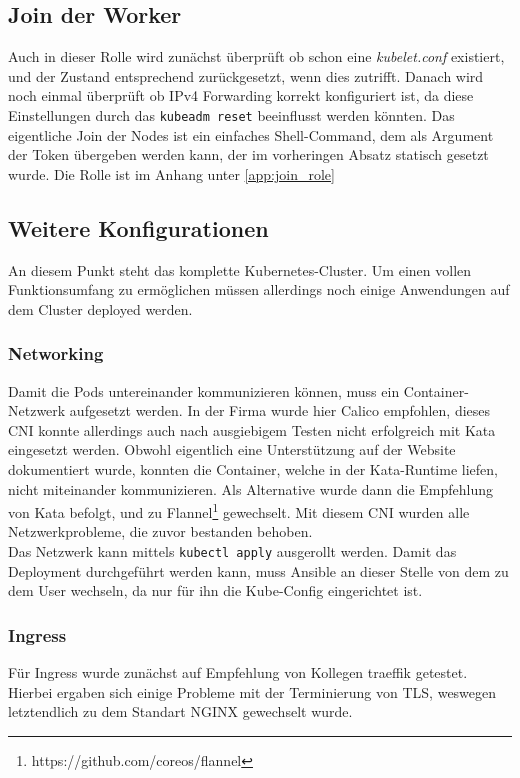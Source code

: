 \subsection{Join der Worker}
Auch in dieser Rolle wird zunächst überprüft ob schon eine \textit{kubelet.conf} existiert, und der Zustand entsprechend zurückgesetzt, wenn dies zutrifft.
Danach wird noch einmal überprüft ob IPv4 Forwarding korrekt konfiguriert ist, da diese Einstellungen durch das \texttt{kubeadm\ reset} beeinflusst werden könnten.
Das eigentliche Join der Nodes ist ein einfaches Shell-Command, dem als Argument der Token übergeben werden kann, der im vorheringen Absatz statisch gesetzt wurde.
Die Rolle ist im Anhang unter \ref{app:join_role}


\subsection{Weitere Konfigurationen}
An diesem Punkt steht das komplette Kubernetes-Cluster.
Um einen vollen Funktionsumfang zu ermöglichen müssen allerdings noch einige Anwendungen auf dem Cluster deployed werden.


\subsubsection{Networking}
Damit die Pods untereinander kommunizieren können, muss ein Container-Netzwerk aufgesetzt werden.
In der Firma wurde hier Calico empfohlen, dieses \ac{CNI} konnte allerdings auch nach ausgiebigem Testen nicht erfolgreich mit Kata eingesetzt werden.
Obwohl eigentlich eine Unterstützung auf der Website dokumentiert wurde, konnten die Container, welche in der Kata-Runtime liefen, nicht miteinander kommunizieren.
Als Alternative wurde dann die Empfehlung von Kata befolgt, und zu Flannel\footnote{https://github.com/coreos/flannel} gewechselt. 
Mit diesem \ac{CNI} wurden alle Netzwerkprobleme, die zuvor bestanden behoben.
\\
Das Netzwerk kann mittels \texttt{kubectl apply} ausgerollt werden.
Damit das Deployment durchgeführt werden kann, muss Ansible an dieser Stelle von dem  zu dem  User wechseln, da nur für ihn die Kube-Config eingerichtet ist.


\subsubsection{Ingress}
Für Ingress wurde zunächst auf Empfehlung von Kollegen traeffik getestet. 
Hierbei ergaben sich einige Probleme mit der Terminierung von \ac{TLS}, weswegen letztendlich zu dem Standart NGINX gewechselt wurde.

